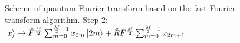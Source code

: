 \begin{figure}
\centering



\caption{Scheme of quantum Fourier transform based on the fast Fourier transform algorithm. Step 2: 
$\ket{x} \rightarrow
\hat{F}^{\frac{M}{2}} \sum_{m = 0}^{\frac{M}{2} - 1} x_{2m} \ket{2m} +
\hat{R}\hat{F}^{\frac{M}{2}} \sum_{m = 0}^{\frac{M}{2} - 1} x_{2m + 1}$}
\label{figQuantCompQuantFourier2}
\end{figure}
